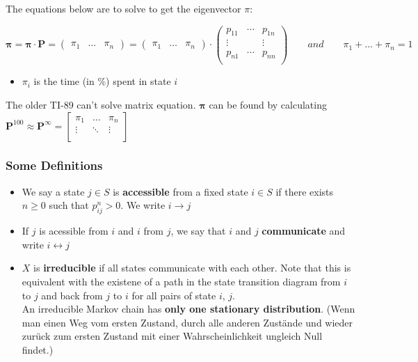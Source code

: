 The equations below are to solve to get the eigenvector $\pi$:

\begin{equation}
\bm{\pi}=\bm{\pi}\cdot \bm{P}=\begin{pmatrix}\pi_1& \ldots & \pi_n\end{pmatrix}=\begin{pmatrix}\pi_1& \ldots & \pi_n\end{pmatrix}\cdot\begin{pmatrix}
		p_{11} &\cdots & p_{1n}\\
		\vdots& & 	\vdots\\
		p_{n1} &\cdots & p_{nn}\\
	\end{pmatrix}\qquad and\qquad\pi_1+\ldots+\pi_n=1\nonumber
\end{equation}

\begin{itemize}
\item $\pi_i$ is the time (in \%) spent in state $i$
\end{itemize}

The older TI-89 can't solve matrix equation. $\bm \pi$ can be found by calculating 
$\bm P^{100} \approx \bm P^\infty = \begin{bmatrix}\pi_1 & \ldots & \pi_n\\ \vdots &\ddots &\vdots\\\end{bmatrix}$

\subsubsection{Some Definitions }
\begin{itemize}
\item We say a state $j\in S$ is \textbf{accessible} from a fixed state $i\in S$ if there exists $n\geq 0 $ such that $p_{ij}^n>0$. We write $i\rightarrow j$
\item If $j$ is acessible from $i$ and $i$ from $j$, we say that $i$ and $j$ \textbf{communicate} and write $i \leftrightarrow j$
\item $X$ is \textbf{irreducible} if all states communicate with each other. Note that this is equivalent with the existene of a path in the state transition diagram from $i$ to $j$ and back from $j$ to $i$ for all pairs of state $i$, $j$.\\

An irreducible Markov chain has \textbf{only one stationary distribution}.
(Wenn man einen Weg vom ersten Zustand, durch alle anderen Zustände und wieder zurück zum ersten Zustand mit einer Wahrscheinlichkeit ungleich Null findet.)
\end{itemize}

